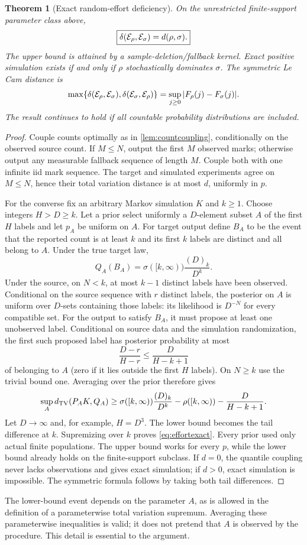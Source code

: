\documentclass[11pt]{article}
\numberwithin{equation}{section}
\newtheorem{theorem}{Theorem}[section]
\theoremstyle{definition}
\theoremstyle{remark}
\begin{document}
\begin{theorem}[Exact random-effort deficiency]\label{thm:effort}
On the unrestricted finite-support parameter class above,
\begin{equation}\label{eq:effortexact}
 \boxed{\delta(\mathcal E_\rho,\mathcal E_\sigma)=d(\rho,\sigma).}
\end{equation}
The upper bound is attained by a sample-deletion/fallback kernel. Exact positive simulation exists if and only if $\rho$ stochastically dominates $\sigma$. The symmetric Le Cam distance is
\[
 \max\{\delta(\mathcal E_\rho,\mathcal E_\sigma),\delta(\mathcal E_\sigma,\mathcal E_\rho)\}
 =\sup_{j\ge0}|F_\rho(j)-F_\sigma(j)|.
\]
The result continues to hold if all countable probability distributions are included.
\end{theorem}
\begin{proof}
Couple counts optimally as in \cref{lem:countcoupling}, conditionally on the observed source count. If $M\le N$, output the first $M$ observed marks; otherwise output any measurable fallback sequence of length $M$. Couple both with one infinite iid mark sequence. The target and simulated experiments agree on $M\le N$, hence their total variation distance is at most $d$, uniformly in $p$.

For the converse fix an arbitrary Markov simulation $K$ and $k\ge1$. Choose integers $H>D\ge k$. Let a prior select uniformly a $D$-element subset $A$ of the first $H$ labels and let $p_A$ be uniform on $A$. For target output define $B_A$ to be the event that the reported count is at least $k$ and its first $k$ labels are distinct and all belong to $A$. Under the true target law,
\[
 Q_A(B_A)=\sigma([k,\infty))\frac{(D)_k}{D^k}.
\]
Under the source, on $N<k$, at most $k-1$ distinct labels have been observed. Conditional on the source sequence with $r$ distinct labels, the posterior on $A$ is uniform over $D$-sets containing those labels: its likelihood is $D^{-N}$ for every compatible set. For the output to satisfy $B_A$, it must propose at least one unobserved label. Conditional on source data and the simulation randomization, the first such proposed label has posterior probability at most
\[
 \frac{D-r}{H-r}\le\frac{D}{H-k+1}
\]
of belonging to $A$ (zero if it lies outside the first $H$ labels). On $N\ge k$ use the trivial bound one. Averaging over the prior therefore gives
\[
 \sup_Ad_{\rm TV}(P_AK,Q_A)
 \ge \sigma([k,\infty))\frac{(D)_k}{D^k}
       -\rho([k,\infty))-\frac{D}{H-k+1}.
\]
Let $D\to\infty$ and, for example, $H=D^3$. The lower bound becomes the tail difference at $k$. Supremizing over $k$ proves \eqref{eq:effortexact}. Every prior used only actual finite populations. The upper bound works for every $p$, while the lower bound already holds on the finite-support subclass. If $d=0$, the quantile coupling never lacks observations and gives exact simulation; if $d>0$, exact simulation is impossible. The symmetric formula follows by taking both tail differences.
\end{proof}
The lower-bound event depends on the parameter $A$, as is allowed in the definition of a parameterwise total variation supremum. Averaging these parameterwise inequalities is valid; it does not pretend that $A$ is observed by the procedure. This detail is essential to the argument.
\end{document}
